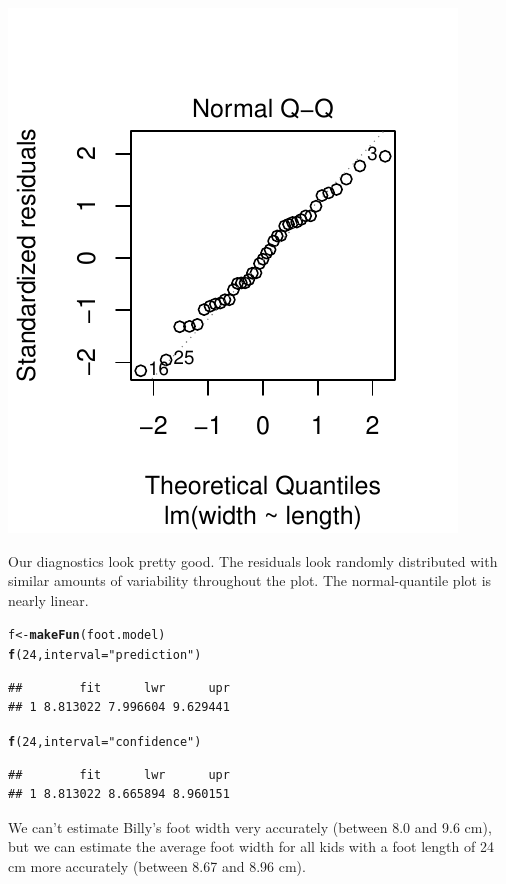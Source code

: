 \documentclass[twoside]{book}\usepackage[]{graphicx}\usepackage[]{xcolor}
\makeatletter
\def\maxwidth{ %
  \ifdim\Gin@nat@width>\linewidth
    \linewidth
  \else
    \Gin@nat@width
  \fi
}
\newcommand{\hlnum}[1]{\textcolor[rgb]{0.686,0.059,0.569}{#1}}%
\newcommand{\hlstr}[1]{\textcolor[rgb]{0.192,0.494,0.8}{#1}}%
\newcommand{\hlstd}[1]{\textcolor[rgb]{0.345,0.345,0.345}{#1}}%
\newcommand{\hlkwb}[1]{\textcolor[rgb]{0.69,0.353,0.396}{#1}}%
\newcommand{\hlkwc}[1]{\textcolor[rgb]{0.333,0.667,0.333}{#1}}%
\newcommand{\hlkwd}[1]{\textcolor[rgb]{0.737,0.353,0.396}{\textbf{#1}}}%
\newenvironment{kframe}{%
 \def\at@end@of@kframe{}%
 \ifinner\ifhmode%
  \def\at@end@of@kframe{\end{minipage}}%
  \begin{minipage}{\columnwidth}%
 \fi\fi%
 \def\FrameCommand##1{\hskip\@totalleftmargin \hskip-\fboxsep
 \colorbox{shadecolor}{##1}\hskip-\fboxsep
     \hskip-\linewidth \hskip-\@totalleftmargin \hskip\columnwidth}%
 \MakeFramed {\advance\hsize-\width
   \@totalleftmargin\z@ \linewidth\hsize
   \@setminipage}}%
 {\par\unskip\endMakeFramed%
 \at@end@of@kframe}
\newenvironment{knitrout}{}{} %
\makeatother
\begin{document}
\begin{solution}
\begin{knitrout}
{\includegraphics[width=\maxwidth]{figures/fig-unnamed-chunk-185-2} 

}



\end{knitrout}
Our diagnostics look pretty good.  The residuals look randomly distributed with
similar amounts of variability throughout the plot.  The normal-quantile plot
is nearly linear.

\begin{knitrout}
\color{fgcolor}\begin{kframe}
\begin{alltt}
\hlstd{f} \hlkwb{<-} \hlkwd{makeFun}\hlstd{(foot.model)}
\hlkwd{f}\hlstd{(}\hlnum{24}\hlstd{,} \hlkwc{interval} \hlstd{=} \hlstr{"prediction"}\hlstd{)}
\end{alltt}
\begin{verbatim}
##        fit      lwr      upr
## 1 8.813022 7.996604 9.629441
\end{verbatim}
\begin{alltt}
\hlkwd{f}\hlstd{(}\hlnum{24}\hlstd{,} \hlkwc{interval} \hlstd{=} \hlstr{"confidence"}\hlstd{)}
\end{alltt}
\begin{verbatim}
##        fit      lwr      upr
## 1 8.813022 8.665894 8.960151
\end{verbatim}
\end{kframe}
\end{knitrout}
We can't estimate Billy's foot width very accurately (between 8.0 and 9.6 cm),
but we can estimate the average foot width for all kids with a foot length of
24 cm more accurately (between 8.67 and 8.96 cm).
\end{solution}
\end{document}
